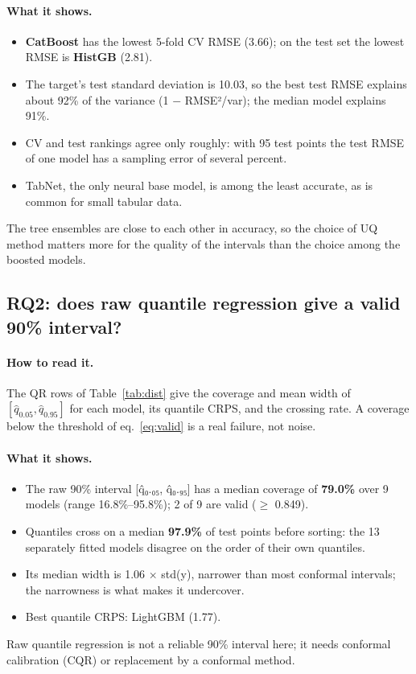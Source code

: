 \documentclass[11pt]{article}
\begin{document}
\paragraph{What it shows.}
\begin{itemize}
\item \textbf{CatBoost} has the lowest 5-fold CV RMSE (3.66); on the test set the lowest RMSE is \textbf{HistGB} (2.81).
\item The target's test standard deviation is 10.03, so the best test RMSE explains about 92\% of the variance (1 $-$ RMSE²/var); the median model explains 91\%.
\item CV and test rankings agree only roughly: with 95 test points the test RMSE of one model has a sampling error of several percent.
\item TabNet, the only neural base model, is among the least accurate, as is common for small tabular data.
\end{itemize}
\begin{insight}[Takeaway RQ1]
The tree ensembles are close to each other in accuracy, so the choice of UQ method matters more for the quality of the intervals than the choice among the boosted models.
\end{insight}

\subsection{RQ2: does raw quantile regression give a valid 90\% interval?}
\paragraph{How to read it.} The QR rows of Table~\ref{tab:dist} give the coverage and mean width of $[\hat q_{0.05},\hat q_{0.95}]$ for each model, its quantile CRPS, and the crossing rate. A coverage below the threshold of eq.~\eqref{eq:valid} is a real failure, not noise.
\paragraph{What it shows.}
\begin{itemize}
\item The raw 90\% interval [q̂₀.₀₅, q̂₀.₉₅] has a median coverage of \textbf{79.0\%} over 9 models (range 16.8\%--95.8\%); 2 of 9 are valid ($\geq$ 0.849).
\item Quantiles cross on a median \textbf{97.9\%} of test points before sorting: the 13 separately fitted models disagree on the order of their own quantiles.
\item Its median width is 1.06 $\times$ std(y), narrower than most conformal intervals; the narrowness is what makes it undercover.
\item Best quantile CRPS: LightGBM (1.77).
\end{itemize}
\begin{insight}[Takeaway RQ2]
Raw quantile regression is not a reliable 90\% interval here; it needs conformal calibration (CQR) or replacement by a conformal method.
\end{insight}
\end{document}
